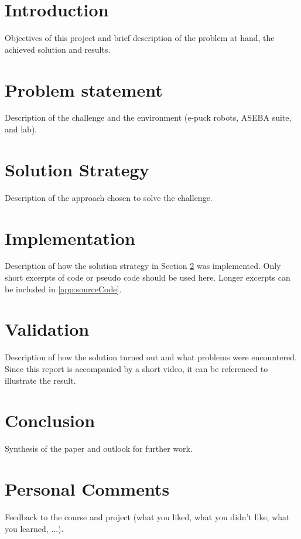\documentclass[12pt,a4paper]{article}
\begin{document}
\section*{Introduction}
Objectives of this project and brief description of the problem at hand, the achieved solution and results.

\section{Problem statement}
Description of the challenge and the environment (e-puck robots, ASEBA suite, and lab).

\section{Solution Strategy} \label{sec:solStrategy}
Description of the approach chosen to solve the challenge.

\section{Implementation}
Description of how the solution strategy in Section \ref{sec:solStrategy} was implemented. Only short excerpts of code or pseudo code should be used here. Longer excerpts can be included in \ref{app:sourceCode}.

\section{Validation}
Description of how the solution turned out and what problems were encountered. Since this report is accompanied by a short video, it can be referenced to illustrate the result.

\section*{Conclusion}
Synthesis of the paper and outlook for further work.

\section*{Personal Comments}
Feedback to the course and project (what you liked, what you didn't like, what you learned, ...).
\end{document}
